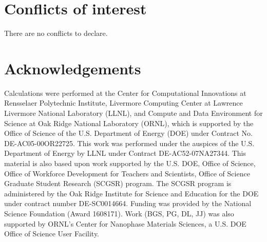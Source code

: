 \documentclass[twoside,twocolumn,9pt]{article}
\renewcommand{\refname}{Notes and references}
\begin{document}
\section*{Conflicts of interest}
\label{sec:conflicts}
There are no conflicts to declare.

\section*{Acknowledgements}
\label{sec:acknowledgements}

Calculations were performed at the Center for Computational Innovations at
Rensselaer Polytechnic Institute, Livermore Computing Center at Lawrence
Livermore National Laboratory (LLNL), and Compute and Data Environment for
Science at Oak Ridge National Laboratory (ORNL), which is supported by the
Office of Science of the U.S. Department of Energy (DOE) under Contract No.
DE-AC05-00OR22725.
This work was performed under the auspices of the U.S. Department of Energy by
LLNL under Contract DE-AC52-07NA27344.
This material is also based upon work supported by the U.S. DOE, Office of
Science, Office of Workforce Development for Teachers and Scientists, Office of
Science Graduate Student Research (SCGSR) program.
The SCGSR program is administered by the Oak Ridge Institute for Science and
Education for the DOE under contract number DE‐SC0014664.
Funding was provided by the National Science Foundation (Award 1608171).  Work
(BGS, PG, DL, JJ) was also supported by ORNL's Center for Nanophase Materials
Sciences, a U.S. DOE Office of Science User Facility.



\balance



\end{document}

